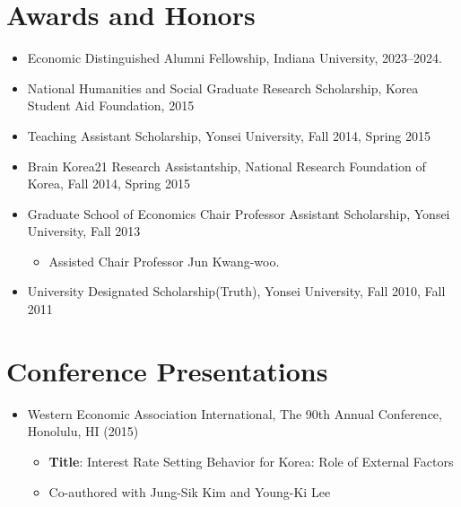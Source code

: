 \documentclass[11pt,a4paper]{article}
\begin{document}
\section*{Awards and Honors}
\begin{itemize}[leftmargin=*]   
\item Economic Distinguished Alumni Fellowship, Indiana University, 2023--2024.    
\item National Humanities and Social Graduate Research Scholarship, Korea Student Aid Foundation, 2015
\item Teaching Assistant Scholarship, Yonsei University, Fall 2014, Spring 2015
\item Brain Korea21 Research Assistantship, National Research Foundation of Korea, Fall 2014, Spring 2015
\item Graduate School of Economics Chair Professor Assistant Scholarship, Yonsei University, Fall 2013
\begin{itemize}
    \item Assisted Chair Professor Jun Kwang-woo.
\end{itemize}
\item University Designated Scholarship(Truth), Yonsei University, Fall 2010, Fall 2011
\end{itemize}

\vspace{5mm}

\section*{Conference Presentations}
\begin{itemize}[leftmargin=*]
    \item Western Economic Association International, The 90th Annual Conference, Honolulu, HI (2015)
    \begin{itemize}
        \item \textbf{Title}: Interest Rate Setting Behavior for Korea: Role of External Factors 
        \item Co-authored with Jung-Sik Kim and Young-Ki Lee
    \end{itemize}    
\end{itemize}
\vspace{5mm}
\end{document}
